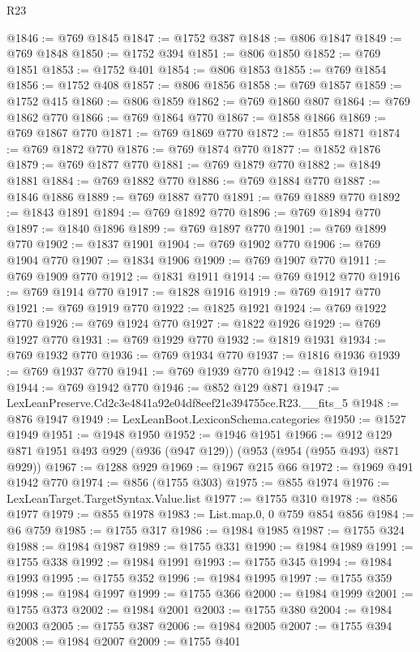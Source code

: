 \begin{lexlean}{R23}
\begin{coremodule}
@1846 := @769 @1845
@1847 := @1752 @387
@1848 := @806 @1847
@1849 := @769 @1848
@1850 := @1752 @394
@1851 := @806 @1850
@1852 := @769 @1851
@1853 := @1752 @401
@1854 := @806 @1853
@1855 := @769 @1854
@1856 := @1752 @408
@1857 := @806 @1856
@1858 := @769 @1857
@1859 := @1752 @415
@1860 := @806 @1859
@1862 := @769 @1860 @807
@1864 := @769 @1862 @770
@1866 := @769 @1864 @770
@1867 := @1858 @1866
@1869 := @769 @1867 @770
@1871 := @769 @1869 @770
@1872 := @1855 @1871
@1874 := @769 @1872 @770
@1876 := @769 @1874 @770
@1877 := @1852 @1876
@1879 := @769 @1877 @770
@1881 := @769 @1879 @770
@1882 := @1849 @1881
@1884 := @769 @1882 @770
@1886 := @769 @1884 @770
@1887 := @1846 @1886
@1889 := @769 @1887 @770
@1891 := @769 @1889 @770
@1892 := @1843 @1891
@1894 := @769 @1892 @770
@1896 := @769 @1894 @770
@1897 := @1840 @1896
@1899 := @769 @1897 @770
@1901 := @769 @1899 @770
@1902 := @1837 @1901
@1904 := @769 @1902 @770
@1906 := @769 @1904 @770
@1907 := @1834 @1906
@1909 := @769 @1907 @770
@1911 := @769 @1909 @770
@1912 := @1831 @1911
@1914 := @769 @1912 @770
@1916 := @769 @1914 @770
@1917 := @1828 @1916
@1919 := @769 @1917 @770
@1921 := @769 @1919 @770
@1922 := @1825 @1921
@1924 := @769 @1922 @770
@1926 := @769 @1924 @770
@1927 := @1822 @1926
@1929 := @769 @1927 @770
@1931 := @769 @1929 @770
@1932 := @1819 @1931
@1934 := @769 @1932 @770
@1936 := @769 @1934 @770
@1937 := @1816 @1936
@1939 := @769 @1937 @770
@1941 := @769 @1939 @770
@1942 := @1813 @1941
@1944 := @769 @1942 @770
@1946 := @852 @129 @871
@1947 := LexLeanPreserve.Cd2c3e4841a92e04df8eef21e394755ce.R23.__fits_5
@1948 := @876 @1947
@1949 := LexLeanBoot.LexiconSchema.categories
@1950 := @1527 @1949
@1951 := @1948 @1950
@1952 := @1946 @1951
@1966 := @912 @129 @871 @1951 @493 @929 (@936 (@947 @129)) (@953 (@954 (@955 @493) @871 @929))
@1967 := @1288 @929
@1969 := @1967 @215 @66
@1972 := @1969 @491 @1942 @770
@1974 := @856 (@1755 @303)
@1975 := @855 @1974
@1976 := LexLeanTarget.TargetSyntax.Value.list
@1977 := @1755 @310
@1978 := @856 @1977
@1979 := @855 @1978
@1983 := List.map.{0, 0} @759 @854 @856
@1984 := @6 @759
@1985 := @1755 @317
@1986 := @1984 @1985
@1987 := @1755 @324
@1988 := @1984 @1987
@1989 := @1755 @331
@1990 := @1984 @1989
@1991 := @1755 @338
@1992 := @1984 @1991
@1993 := @1755 @345
@1994 := @1984 @1993
@1995 := @1755 @352
@1996 := @1984 @1995
@1997 := @1755 @359
@1998 := @1984 @1997
@1999 := @1755 @366
@2000 := @1984 @1999
@2001 := @1755 @373
@2002 := @1984 @2001
@2003 := @1755 @380
@2004 := @1984 @2003
@2005 := @1755 @387
@2006 := @1984 @2005
@2007 := @1755 @394
@2008 := @1984 @2007
@2009 := @1755 @401

\end{coremodule}
\end{lexlean}
